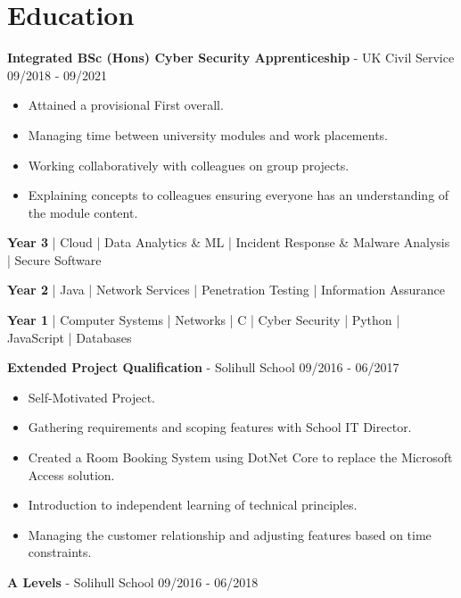 \documentclass{article}
\begin{document}
\section*{Education}

\textbf{Integrated BSc (Hons) Cyber Security Apprenticeship} - UK Civil Service \hfill 09/2018 - 09/2021

\begin{multicols}{2}
\begin{itemize}
\itemsep0em
	\item Attained a provisional First overall.
	\item Managing time between university modules and work placements.
	\item Working collaboratively with colleagues on group projects.
	\item Explaining concepts to colleagues ensuring everyone has an understanding of the module content.
\end{itemize}
\end{multicols}

\begin{center}
	\textbf{Year 3} | Cloud | Data Analytics \& ML | Incident Response \& Malware Analysis | Secure Software

	\textbf{Year 2} | Java | Network Services | Penetration Testing | Information Assurance

	\textbf{Year 1} | Computer Systems | Networks | C | Cyber Security | Python | JavaScript | Databases
\end{center}

\textbf{Extended Project Qualification} - Solihull School \hfill 09/2016 - 06/2017

\begin{multicols}{2}
\begin{itemize}
\itemsep0em
	\item Self-Motivated Project.
	\item Gathering requirements and scoping features with School IT Director.
	\item Created a Room Booking System using DotNet Core to replace the Microsoft Access solution.
	\item Introduction to independent learning of technical principles.
	\item Managing the customer relationship and adjusting features based on time constraints.
\end{itemize}
\end{multicols}

\textbf{A Levels} - Solihull School \hfill 09/2016 - 06/2018
\end{document}
